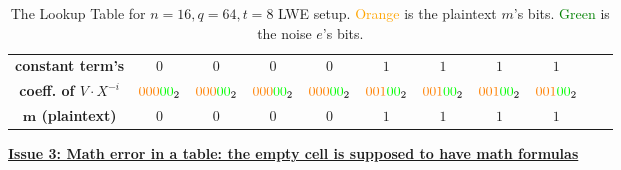\begin{table}[h]
{\begin{tabular}{|c||c|c|c|c|c|c|c|c|c|c|}
\hline
\textbf{constant term's} & $0$ & $0$ & $0$ & $0$ & $1$ & $1$ & $1$ & $1$ \\
\textbf{coeff. of $V\cdot X^{-i}$}& $\textcolor{orange}{000}\textcolor{green}{00}_2$ & $\textcolor{orange}{000}\textcolor{green}{00}_2$ & $\textcolor{orange}{000}\textcolor{green}{00}_2$ & $\textcolor{orange}{000}\textcolor{green}{00}_2$ & $\textcolor{orange}{001}\textcolor{green}{00}_2$ & $\textcolor{orange}{001}\textcolor{green}{00}_2$ & $\textcolor{orange}{001}\textcolor{green}{00}_2$ & $\textcolor{orange}{001}\textcolor{green}{00}_2$ \\
\hline
\textbf{$\bm{m}$ (plaintext)} & $0$ & $0$ & $0$ & $0$ & $1$ & $1$ & $1$ & $1$ \\
\hline
\end{tabular}}
\centering
\caption{The Lookup Table for $n=16, q=64, t=8$ LWE setup.
\textcolor{orange}{Orange} is the plaintext $m$'s bits. \textcolor{green}{Green} is the noise $e$'s bits. %
}
\label{tab:lut}
\end{table}






\underline{\textbf{Issue 3: Math error in a table: the empty cell is supposed to have math formulas}}

